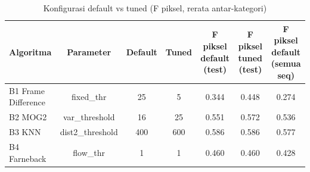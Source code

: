 \begin{table}[t]
\centering
\caption{Konfigurasi default vs tuned (F piksel, rerata antar-kategori)}
\label{tab:table_default_vs_tuned}
\begin{tabular}{lcccccc}
\toprule
Algoritma & Parameter & Default & Tuned & F piksel default (test) & F piksel tuned (test) & F piksel default (semua seq) \\
\midrule
B1 Frame Difference & fixed\_thr & 25 & 5 & 0.344 & 0.448 & 0.274 \\
B2 MOG2 & var\_threshold & 16 & 25 & 0.551 & 0.572 & 0.536 \\
B3 KNN & dist2\_threshold & 400 & 600 & 0.586 & 0.586 & 0.577 \\
B4 Farneback & flow\_thr & 1 & 1 & 0.460 & 0.460 & 0.428 \\
\bottomrule
\end{tabular}
\end{table}
